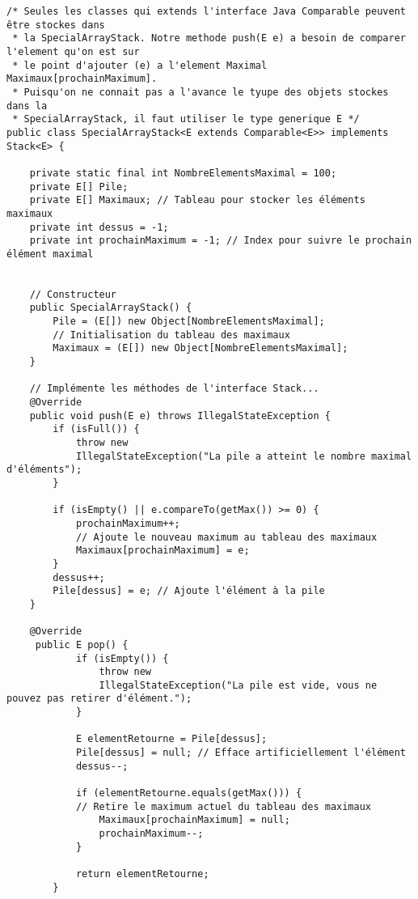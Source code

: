 \documentclass[9pt]{report}
\begin{document}
    \begin{lstlisting}[style=JavaDraculaWhite]
 /* Seules les classes qui extends l'interface Java Comparable peuvent être stockes dans 
 * la SpecialArrayStack. Notre methode push(E e) a besoin de comparer l'element qu'on est sur 
 * le point d'ajouter (e) a l'element Maximal  Maximaux[prochainMaximum]. 
 * Puisqu'on ne connait pas a l'avance le tyupe des objets stockes dans la 
 * SpecialArrayStack, il faut utiliser le type generique E */
public class SpecialArrayStack<E extends Comparable<E>> implements Stack<E> {   

    private static final int NombreElementsMaximal = 100;
    private E[] Pile;
    private E[] Maximaux; // Tableau pour stocker les éléments maximaux
    private int dessus = -1;
    private int prochainMaximum = -1; // Index pour suivre le prochain élément maximal


    // Constructeur
    public SpecialArrayStack() {
        Pile = (E[]) new Object[NombreElementsMaximal];
        // Initialisation du tableau des maximaux
        Maximaux = (E[]) new Object[NombreElementsMaximal]; 
    }

    // Implémente les méthodes de l'interface Stack...
    @Override
    public void push(E e) throws IllegalStateException {
        if (isFull()) {
            throw new 
            IllegalStateException("La pile a atteint le nombre maximal d'éléments");
        }
        
        if (isEmpty() || e.compareTo(getMax()) >= 0) {
            prochainMaximum++; 
            // Ajoute le nouveau maximum au tableau des maximaux
            Maximaux[prochainMaximum] = e;
        }
        dessus++;
        Pile[dessus] = e; // Ajoute l'élément à la pile
    }

    @Override
     public E pop() {
            if (isEmpty()) {
                throw new 
                IllegalStateException("La pile est vide, vous ne pouvez pas retirer d'élément.");
            }
            
            E elementRetourne = Pile[dessus];
            Pile[dessus] = null; // Efface artificiellement l'élément
            dessus--;
            
            if (elementRetourne.equals(getMax())) {
            // Retire le maximum actuel du tableau des maximaux
                Maximaux[prochainMaximum] = null; 
                prochainMaximum--;
            }
            
            return elementRetourne;
        }


\end{lstlisting}
\end{document}
